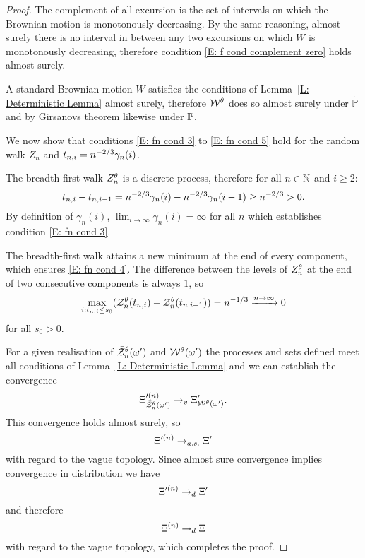 \begin{proof}
	The complement of all excursion is the set of intervals
	on which the Brownian motion is monotonously decreasing.
	By the same reasoning, almost surely there is no interval in between any two excursions on which $W$ is monotonously decreasing,
	therefore condition \eqref{E: f cond complement zero} holds almost surely.
	
	A standard Brownian motion $W$ satisfies the conditions of Lemma~\ref{L: Deterministic Lemma} almost surely,
	therefore $\mathcal{W}^{\theta}$ does so almost surely under $\tilde{\mathbb{P}}$
	and by Girsanovs theorem likewise under $\mathbb{P}$.  

	
	We now show that conditions 
	\eqref{E: fn cond 3} to \eqref{E: fn cond 5}
	hold for the random walk $Z_n$ and $t_{n,i} = n^{-2 / 3} \gamma_n(i)$.
	
	The breadth-first walk $Z_n^{\theta}$ is a discrete process, therefore for all $n \in \mathbb{N}$ and $i \geq 2$:
	\begin{equation}
		t_{n, i} - t_{n, i-1} = n^{-2 / 3}\gamma_n(i) - n^{-2 / 3}\gamma_n(i-1) \geq n^{-2 / 3} > 0.
	\end{equation}
	By definition of $\gamma_n(i)$,
	$\lim_{i \rightarrow \infty} \gamma_n(i) = \infty$ for all $n$
	which establishes condition \eqref{E: fn cond 3}.
	
	The breadth-first walk attains a new minimum at the end of every component,
	which ensures \eqref{E: fn cond 4}.
	The difference between the levels of $Z_n^{\theta}$ at the end of two consecutive components is always $1$,
	so 
	\begin{equation}
		\max_{i: t_{n, i} \leq s_0}(\bar{\mathcal{Z}}^{\theta}_n(t_{n, i}) - \bar{\mathcal{Z}}^{\theta}_n(t_{n, i+1})) = n^{-1 / 3} \xrightarrow{n \rightarrow \infty} 0
	\end{equation}
	for all $s_0 > 0$.
	
	
	For a given realisation of $\bar{\mathcal{Z}}^{\theta}_n(\omega')$ and $\mathcal{W}^{\theta}(\omega')$ 
	the processes and sets defined meet all conditions of Lemma~\ref{L: Deterministic Lemma}
	and we can establish the convergence
	\begin{equation}	
		\Xi^{\prime (n)}_{\bar{\mathcal{Z}}^{\theta}_n(\omega')} \rightarrow_v \Xi^{\prime}_{\mathcal{W}^{\theta}(\omega')}.
	\end{equation}
	This convergence holds almost surely, so
	\begin{equation}
		\Xi^{\prime (n)} \rightarrow_{a.s.} \Xi^{\prime}
	\end{equation}
	with regard to the vague topology.
	Since almost sure convergence implies convergence in distribution we have
	\begin{equation}
		\Xi^{\prime (n)} \rightarrow_d \Xi^{\prime}
	\end{equation}
	and therefore
	\begin{equation}
		\Xi^{(n)} \rightarrow_d \Xi
	\end{equation}
	with regard to the vague topology, which completes the proof.	
\end{proof}


